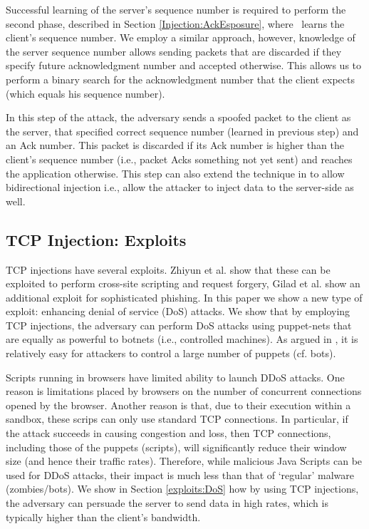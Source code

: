 \documentclass[conference]{IEEEtran}
\begin{document}
Successful learning of the server's sequence number is required to perform the second phase, described in Section \ref{Injection:AckEsposure}, where \mal\ learns the client's sequence number. 
We employ a similar approach, however, knowledge of the server sequence number allows sending packets that are discarded if they specify future acknowledgment number and accepted otherwise. This allows us to perform a binary search for the acknowledgment number that the client expects (which equals his sequence number).


In this step of the attack, the adversary sends a spoofed packet to the client as the server, that specified correct sequence number (learned in previous step) and an Ack number. This packet is discarded if its Ack number is higher than the client's sequence number (i.e., packet Acks something not yet sent) and reaches the application otherwise. This step can also extend the technique in \cite{snptcp} to allow bidirectional injection i.e., allow the attacker to inject data to the server-side as well.

\subsection{TCP Injection: Exploits} \label{dosandother}

TCP injections have several exploits. Zhiyun et al. \cite{snptcp} show that these can be exploited to perform cross-site scripting and request forgery, Gilad et al. \cite{woottcp} show an additional exploit for sophisticated phishing. In this paper we show a new type of exploit: enhancing denial of service (DoS) attacks. We show that by employing TCP injections, the adversary can perform DoS attacks using puppet-nets that are equally as powerful to botnets (i.e., controlled machines). As argued in \cite{AATA08:puppetnets}, it is relatively easy for attackers to control a large number of puppets (cf. bots).

Scripts running in browsers have limited ability to launch DDoS attacks. One reason is limitations placed by browsers on the number of concurrent connections opened by the browser. Another reason is that, due to their execution within a sandbox, these scrips can only use standard TCP connections. In particular, if the attack succeeds in causing congestion and loss, then TCP connections, including those of the puppets (scripts), will significantly reduce their window size (and hence their traffic rates). Therefore, while malicious Java Scripts can be used for DDoS attacks, their impact is much less than that of `regular' malware (zombies/bots). 
We show in Section \ref{exploits:DoS} how by using TCP injections, the adversary can persuade the server to send data in high rates, which is typically higher than the client's bandwidth.
\end{document}
